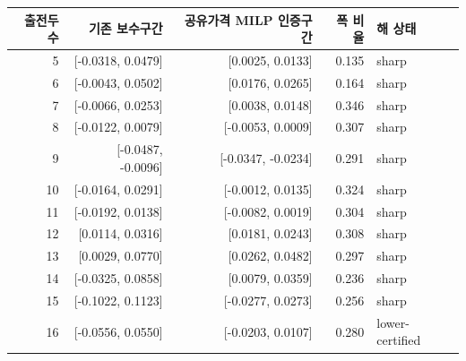 \begin{tabular}{rrrrl}
\toprule
출전두수 & 기존 보수구간 & 공유가격 MILP 인증구간 & 폭 비율 & 해 상태 \\
\midrule
5 & [-0.0318, 0.0479] & [0.0025, 0.0133] & 0.135 & sharp \\
6 & [-0.0043, 0.0502] & [0.0176, 0.0265] & 0.164 & sharp \\
7 & [-0.0066, 0.0253] & [0.0038, 0.0148] & 0.346 & sharp \\
8 & [-0.0122, 0.0079] & [-0.0053, 0.0009] & 0.307 & sharp \\
9 & [-0.0487, -0.0096] & [-0.0347, -0.0234] & 0.291 & sharp \\
10 & [-0.0164, 0.0291] & [-0.0012, 0.0135] & 0.324 & sharp \\
11 & [-0.0192, 0.0138] & [-0.0082, 0.0019] & 0.304 & sharp \\
12 & [0.0114, 0.0316] & [0.0181, 0.0243] & 0.308 & sharp \\
13 & [0.0029, 0.0770] & [0.0262, 0.0482] & 0.297 & sharp \\
14 & [-0.0325, 0.0858] & [0.0079, 0.0359] & 0.236 & sharp \\
15 & [-0.1022, 0.1123] & [-0.0277, 0.0273] & 0.256 & sharp \\
16 & [-0.0556, 0.0550] & [-0.0203, 0.0107] & 0.280 & lower-certified \\
\bottomrule
\end{tabular}
